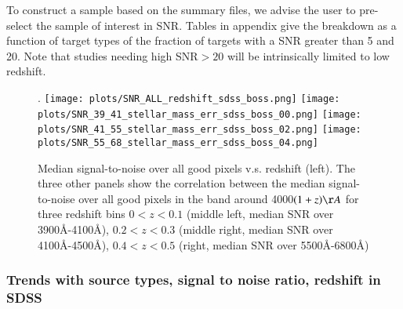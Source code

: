 \documentclass[onecolumn]{aa}
\begin{document}
To construct a sample based on the summary files, we advise the user to pre-select the sample of interest in SNR. Tables in appendix give the breakdown as a function of target types of the fraction of targets with a SNR greater than 5 and 20. Note that studies needing high SNR$>20$ will be intrinsically limited to low redshift.



\begin{figure*}
\begin{center}
\caption{\label{fig:mass:redshift} 
Median signal-to-noise over all good pixels v.s. redshift (left).  
The three other panels show the correlation between the median signal-to-noise over all good pixels in the band around 4000$(1+z)\AA$ for three redshift bins $0<z<0.1$ (middle left, median SNR over 3900\AA-4100\AA), $0.2<z<0.3$ (middle right, median SNR over 4100\AA-4500\AA), $0.4<z<0.5$ (right, median SNR over 5500\AA-6800\AA)}.  
\texttt{[image: plots/SNR\_ALL\_redshift\_sdss\_boss.png]}
\texttt{[image: plots/SNR\_39\_41\_stellar\_mass\_err\_sdss\_boss\_00.png]}
\texttt{[image: plots/SNR\_41\_55\_stellar\_mass\_err\_sdss\_boss\_02.png]}
\texttt{[image: plots/SNR\_55\_68\_stellar\_mass\_err\_sdss\_boss\_04.png]}
\end{center}
\end{figure*}


\subsubsection{Trends with source types, signal to noise ratio, redshift in SDSS}
\end{document}
